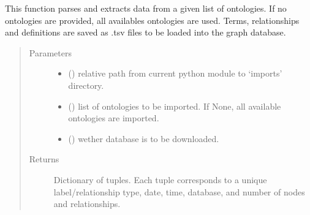 \documentclass[letterpaper,10pt,english]{sphinxmanual}
\begin{document}
\begin{fulllineitems}
\label{\detokenize{_autosummary/graphdb_builder.ontologies:graphdb_builder.ontologies.ontologies_controller.generate_graphFiles}}
This function parses and extracts data from a given list of ontologies. If no ontologies are provided,     all availables ontologies are used. Terms, relationships and definitions are saved as .tsv files to be loaded into     the graph database.
\begin{quote}\begin{description}
\item[{Parameters}] \leavevmode\begin{itemize}
\item {} 
 () \textendash{} relative path from current python module to ‘imports’ directory.

\item {} 
 () \textendash{} list of ontologies to be imported. If None, all available ontologies are imported.

\item {} 
 () \textendash{} wether database is to be downloaded.

\end{itemize}

\item[{Returns}] \leavevmode
Dictionary of tuples. Each tuple corresponds to a unique label/relationship type, date, time,             database, and number of nodes and relationships.

\end{description}\end{quote}

\end{fulllineitems}
\end{document}
